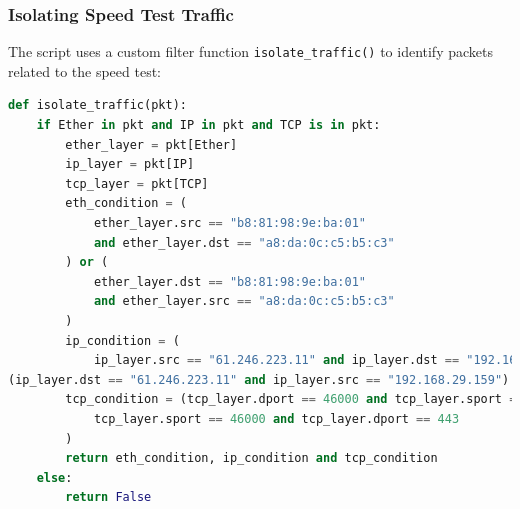 \documentclass{article}
\begin{document}
\subsubsection{Isolating Speed Test Traffic}

The script uses a custom filter function \texttt{isolate\_traffic()} to identify packets related to the speed test:

\begin{lstlisting}[language=Python]
def isolate_traffic(pkt):
    if Ether in pkt and IP in pkt and TCP is in pkt:
        ether_layer = pkt[Ether]
        ip_layer = pkt[IP]
        tcp_layer = pkt[TCP]
        eth_condition = (
            ether_layer.src == "b8:81:98:9e:ba:01"
            and ether_layer.dst == "a8:da:0c:c5:b5:c3"
        ) or (
            ether_layer.dst == "b8:81:98:9e:ba:01"
            and ether_layer.src == "a8:da:0c:c5:b5:c3"
        )
        ip_condition = (
            ip_layer.src == "61.246.223.11" and ip_layer.dst == "192.168.29.159"
(ip_layer.dst == "61.246.223.11" and ip_layer.src == "192.168.29.159")
        tcp_condition = (tcp_layer.dport == 46000 and tcp_layer.sport == 443) or (
            tcp_layer.sport == 46000 and tcp_layer.dport == 443
        )
        return eth_condition, ip_condition and tcp_condition
    else:
        return False
\end{lstlisting}
\end{document}
